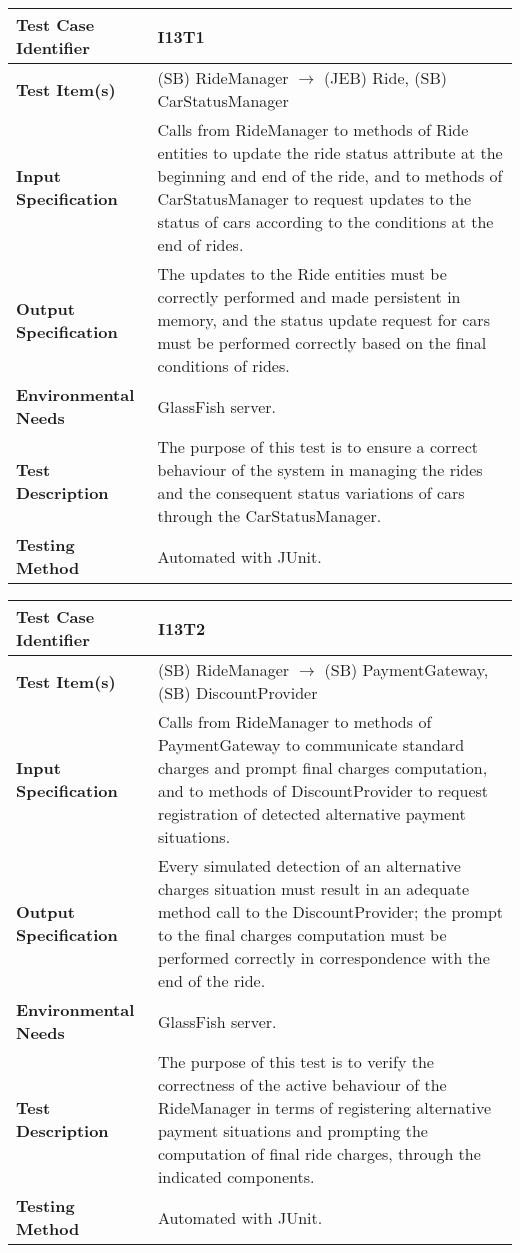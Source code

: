 \begin{longtable}{p{} | p{}}
\hline
\textbf{Test Case Identifier} & I13T1\\
\hline
\textbf{Test Item(s)} & (SB) RideManager $\rightarrow$ (JEB) Ride, (SB) CarStatusManager \\
\hline
\textbf{Input Specification} & Calls from RideManager to methods of Ride entities to update the ride status attribute at the beginning and end of the ride, and to methods of CarStatusManager to request updates to the status of cars according to the conditions at the end of rides. \\
\hline
\textbf{Output Specification} & The updates to the Ride entities must be correctly performed and made persistent in memory, and the status update request for cars must be performed correctly based on the final conditions of rides. \\
\hline
\textbf{Environmental Needs} & GlassFish server. \\
\hline
\textbf{Test Description} & The purpose of this test is to ensure a correct behaviour of the system in managing the rides and the consequent status variations of cars through the CarStatusManager. \\
\hline
\textbf{Testing Method} & Automated with JUnit. \\
\hline
\end{longtable}

\begin{longtable}{p{} | p{}}
\hline
\textbf{Test Case Identifier} & I13T2\\
\hline
\textbf{Test Item(s)} & (SB) RideManager $\rightarrow$ (SB) PaymentGateway, (SB) DiscountProvider \\
\hline
\textbf{Input Specification} & Calls from RideManager to methods of PaymentGateway to communicate standard charges and prompt final charges computation, and to methods of DiscountProvider to request registration of detected alternative payment situations. \\
\hline
\textbf{Output Specification} & Every simulated detection of an alternative charges situation must result in an adequate method call to the DiscountProvider; the prompt to the final charges computation must be performed correctly in correspondence with the end of the ride. \\
\hline
\textbf{Environmental Needs} & GlassFish server. \\
\hline
\textbf{Test Description} & The purpose of this test is to verify the correctness of the active behaviour of the RideManager in terms of registering alternative payment situations and prompting the computation of final ride charges, through the indicated components. \\
\hline
\textbf{Testing Method} & Automated with JUnit. \\
\hline
\end{longtable}


